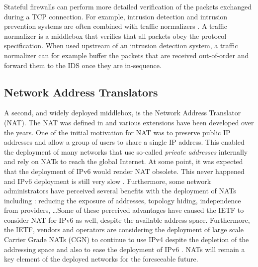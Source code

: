 Stateful firewalls can perform more detailed verification of the packets exchanged during a TCP connection. For example, intrusion detection and intrusion prevention systems are often combined with traffic normalizers \cite{Vutukuru_TCP:2008,handley2001network}. A traffic normalizer is a middlebox that verifies that all packets obey the protocol specification. When used upstream of an intrusion detection system, a traffic normalizer can for example buffer the packets that are received out-of-order and forward them to the IDS once they are in-sequence.

\subsection{Network Address Translators}

A second, and widely deployed middlebox, is the Network Address Translator (NAT). The NAT was defined in \cite{rfc1631} and various extensions have been developed over the years. One of the initial motivation for NAT was to preserve public IP addresses and allow a group of users to share a single IP address. This enabled the deployment of many networks that use so-called \emph{private addresses} \cite{rfc1918} internally and rely on NATs to reach the global Internet. At some point, it was expected that the deployment of IPv6 would render NAT obsolete. This never happened and IPv6 deployment is still very slow \cite{Dhamdhere_IPv6:2012}. Furthermore, some network administrators have perceived several benefits with the deployment of NATs \cite{rfc2993} including : reducing the exposure of addresses, topology hiding, independence from providers, \ldots Some of these perceived advantages have caused the IETF to consider NAT for IPv6 as well, despite the available address space. Furthermore, the IETF, vendors and operators are considering the deployment of large scale Carrier Grade NATs (CGN) to continue to use IPv4 despite the depletion of the addressing space \cite{rfc6888} and also to ease the deployment of IPv6 \cite{rfc6264}. NATs will remain a key element of the deployed networks for the foreseeable future. 


